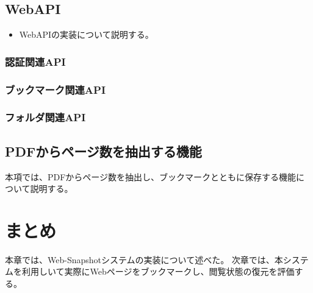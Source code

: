 \subsection{WebAPI}
\begin{itemize}
  \item WebAPIの実装について説明する。
\end{itemize}

\subsubsection{認証関連API}

\subsubsection{ブックマーク関連API}


\subsubsection{フォルダ関連API}

\subsection{PDFからページ数を抽出する機能}
本項では、PDFからページ数を抽出し、ブックマークとともに保存する機能について説明する。



\section{まとめ}
本章では、Web-Snapshotシステムの実装について述べた。
次章では、本システムを利用しいて実際にWebページをブックマークし、閲覧状態の復元を評価する。